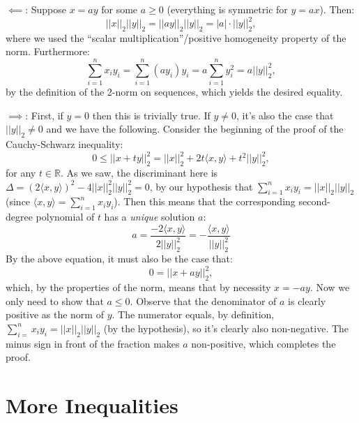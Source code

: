 \begin{solution}

    $\impliedby$: Suppose $x = ay$ for some $a \geq 0$ (everything is symmetric for $y = ax$).
    Then:
    $$\lvert \lvert x \rvert \rvert_2 \lvert \lvert y \rvert \rvert_2 = \lvert \lvert a y \rvert \rvert_2 \lvert \lvert y \rvert \rvert_2 = \lvert a \rvert \cdot \lvert \lvert y \rvert \rvert_2^2,$$
    where we used the ``scalar multiplication''/positive homogeneity property of the norm.
    Furthermore:
    $$\sum_{i = 1}^{n} x_i y_i = \sum_{i=1}^{n} (a y_i) y_i = a \sum_{i=1}^{n} y_i^2 = a \lvert \lvert y \rvert \rvert_2^2,$$ 
    by the definition of the 2-norm on sequences, which yields the desired equality.

    $\implies$: First, if $y = 0$ then this is trivially true. If $y \neq 0$, it's also the case that $\lvert \lvert y \rvert \rvert_2 \neq 0$ and we have the following.
    Consider the beginning of the proof of the Cauchy-Schwarz inequality:
    $$0 \leq \lvert \lvert x + ty \rvert \rvert_2^2 = \lvert \lvert x \rvert \rvert_2^2 + 2t \langle x, y \rangle + t^2 \lvert \lvert y \rvert \rvert_2^2,$$
    for any $t \in \mathbb{R}$. 
    As we saw, the discriminant here is $\Delta = (2\langle x, y \rangle)^2 - 4 \lvert \lvert x \rvert \rvert_2^2 \lvert \lvert y \rvert \rvert_2^2 = 0$, by our hypothesis that $\sum_{i=1}^{n} x_i y_i = \lvert \lvert x \rvert \rvert_2 \lvert \lvert y \rvert \rvert_2$ (since $\langle x, y \rangle = \sum_{i=1}^{n} x_i y_i$).
    Then this means that the corresponding second-degree polynomial of $t$ has a \textit{unique} solution $a$:
    $$a = \frac{-2 \langle x, y \rangle}{2\lvert \lvert y \rvert \rvert_2^2} = -\frac{ \langle x, y \rangle}{\lvert \lvert y \rvert \rvert_2^2}$$
    By the above equation, it must also be the case that:
    $$0 = \lvert \lvert x + ay \rvert \rvert_2^2,$$
    which, by the properties of the norm, means that by necessity $x = -ay$.
    Now we only need to show that $a \leq 0$.
    Observe that the denominator of $a$ is clearly positive as the norm of $y$.
    The numerator equals, by definition, $\sum_{i=}^{n} x_i y_i = \lvert \lvert x \rvert \rvert_2 \lvert \lvert y \rvert \rvert_2$ (by the hypothesis), so it's clearly also non-negative.
    The minus sign in front of the fraction makes $a$ non-positive, which completes the proof.

\end{solution}

\section{More Inequalities}

